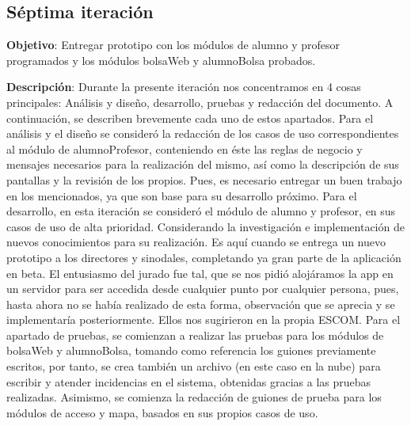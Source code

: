 
\subsection{Séptima iteración}

\noindent
\textbf{Objetivo}: Entregar prototipo con los módulos de alumno y profesor programados y los módulos bolsaWeb y alumnoBolsa probados.
\newline

\noindent
\textbf{Descripción}: Durante la presente iteración nos concentramos en 4 cosas principales: Análisis y diseño, desarrollo, pruebas y redacción del documento. A continuación, se describen brevemente cada uno de estos apartados.
\newline
\newline
Para el análisis y el diseño se consideró la redacción de los casos de uso correspondientes al módulo de alumnoProfesor, conteniendo en éste las reglas de negocio y mensajes necesarios para la realización del mismo, así como la descripción de sus pantallas y la revisión de los propios. Pues, es necesario entregar un buen trabajo en los mencionados, ya que son base para su desarrollo próximo.
\newline
\newline
Para el desarrollo, en esta iteración se consideró el módulo de alumno y profesor, en sus casos de uso de alta prioridad. Considerando la investigación e implementación de nuevos conocimientos para su realización. Es aquí cuando se entrega un nuevo prototipo a los directores y sinodales, completando ya gran parte de la aplicación en beta. El entusiasmo del jurado fue tal, que se nos pidió alojáramos la app en un servidor para ser accedida desde cualquier punto por cualquier persona, pues, hasta ahora no se había realizado de esta forma, observación que se aprecia y se implementaría posteriormente. Ellos nos sugirieron en la propia ESCOM.
\newline
\newline
Para el apartado de pruebas, se comienzan a realizar las pruebas para los módulos de bolsaWeb y alumnoBolsa, tomando como referencia los guiones previamente escritos, por tanto, se crea también un archivo (en este caso en la nube) para escribir y atender incidencias en el sistema, obtenidas gracias a las pruebas realizadas. 
\newline
Asimismo, se comienza la redacción de guiones de prueba para los módulos de acceso y mapa, basados en sus propios casos de uso. 
